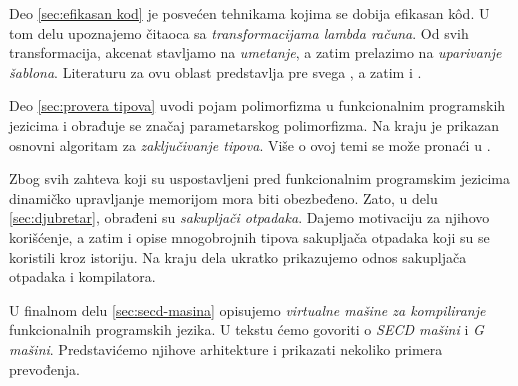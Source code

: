 Deo \ref{sec:efikasan kod} je posvećen tehnikama kojima se dobija efikasan k\^od. U tom delu upoznajemo čitaoca sa \textit{transformacijama lambda računa}. Od svih transformacija, akcenat stavljamo na \textit{umetanje}, a zatim prelazimo na \textit{uparivanje šablona}. Literaturu za ovu oblast predstavlja pre svega \cite{the-implementation-of-functional-programming-languages}, a zatim i \cite{compilation-by-program-transformation, haskell-by-program-transformation, secrets-haskell-compiler-inliner, compiler-design, compiling-fl}.

Deo \ref{sec:provera tipova} uvodi pojam polimorfizma u funkcionalnim programskih jezicima i obrađuje se značaj parametarskog polimorfizma. Na kraju je prikazan osnovni algoritam za \textit{zaključivanje tipova}. Više o ovoj temi se može pronaći u \cite{the-implementation-of-functional-programming-languages, basic-typechecking}.

Zbog svih zahteva koji su uspostavljeni pred funkcionalnim programskim jezicima dinamičko upravljanje memorijom mora biti obezbeđeno. Zato, u delu \ref{sec:djubretar}, obrađeni su \textit{sakupljači otpadaka}. Dajemo motivaciju za njihovo korišćenje, a zatim i opise mnogobrojnih tipova sakupljača otpadaka koji su se koristili kroz istoriju. Na kraju dela ukratko prikazujemo odnos sakupljača otpadaka i kompilatora.

U finalnom delu \ref{sec:secd-masina} opisujemo \textit{virtualne mašine za kompiliranje} funkcionalnih programskih jezika. U tekstu ćemo govoriti o \textit{SECD mašini} i \textit{G mašini}. Predstavićemo njihove arhitekture i prikazati nekoliko primera prevođenja.
